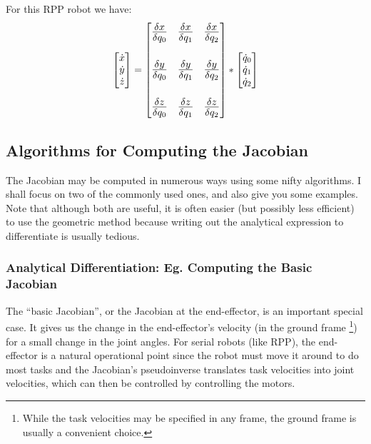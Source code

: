 \documentclass[12pt]{article}
\begin{document}
For this RPP robot we have:
\begin{equation}
  \begin{bmatrix} 
  \dot x \\
  \dot y \\
  \dot z \\
  \end{bmatrix} 
  = 
  {\Large
  \begin{bmatrix} 
    \frac{\delta x}{\delta q_0} & \frac{\delta x}{\delta q_1} & \frac{\delta x}{\delta q_2} \\
    \\
    \frac{\delta y}{\delta q_0} & \frac{\delta y}{\delta q_1} & \frac{\delta y}{\delta q_2} \\ 
    \\
    \frac{\delta z}{\delta q_0} & \frac{\delta z}{\delta q_1} & \frac{\delta z}{\delta q_2}
  \end{bmatrix} 
  }* 
  \begin{bmatrix}
  \dot q_0 \\
  \dot q_1 \\
  \dot q_2 
  \end{bmatrix} 
\end{equation}

\subsection{Algorithms for Computing the Jacobian}
The Jacobian may be computed in numerous ways using some nifty algorithms. I shall focus
on two of the commonly used ones, and also give you some examples. Note that although both
are useful, it is often easier (but possibly less efficient) to use the geometric method 
because writing out the analytical expression to differentiate is usually tedious.

\subsubsection{Analytical Differentiation: Eg. Computing the Basic Jacobian}
The ``basic Jacobian'', or the Jacobian at the end-effector, is an important special case.
It gives us the change in the end-effector's velocity (in the ground frame 
\footnote{While the task velocities may be specified in any frame, the ground frame is usually
a convenient choice.}) 
for a small change in the joint angles.
For serial robots (like RPP), the end-effector is a natural operational point since 
the robot must move it around to do most tasks and the Jacobian's pseudoinverse translates
task velocities into joint velocities, which can then be controlled by controlling the motors.
\end{document}
